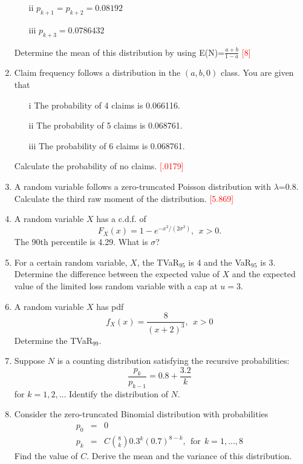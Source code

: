 \documentclass{article}
\begin{document}
\begin{enumerate}
\begin{enumerate}
	\item[ii] $p_{k+1}=p_{k+2}=0.08192$
	\item[iii] $p_{k+3}=0.0786432$
	\end{enumerate}
Determine the mean of this distribution by using E(N)=$\frac{a+b}{1-a}$ \textcolor{red}{[8]}
\item 
Claim frequency follows a distribution in the $(a,b,0)$ class. You are given that
	\begin{enumerate}
	\item[i]The probability of 4 claims is 0.066116.
	\item[ii] The probability of 5 claims is 0.068761.
	\item[iii] The probability of 6 claims is 0.068761.
	\end{enumerate}
Calculate the probability of no claims. \textcolor{red}{[.0179]}
\item
A random variable follows a zero-truncated Poisson distribution with $\lambda$=0.8. Calculate the third raw moment of the distribution. \textcolor{red}{[5.869]}

\item A random variable $X$ has a c.d.f. of \[F_X(x) = 1-e^{-x^2/(2\sigma^2)}, ~~ x > 0. \] The 90th percentile is 4.29. What is $\sigma$?

\item For a certain random variable, $X$, the TVaR$_{95}$ is 4 and the VaR$_{95}$ is 3. Determine the difference between the expected value of $X$ and the expected value of the limited loss random variable with a cap at $u=3$. 


\item A random variable $X$ has pdf \[ f_X(x) = \frac{8}{(x+2)^3},~~x>0\] Determine the TVaR$_{99}$. 

\item Suppose $N$ is a counting distribution satisfying the recursive probabilities:
\[\frac{p_{k}}{p_{k-1}} = 0.8 + \frac{3.2}{k}\]
for $k=1,2,\ldots$
Identify the distribution of $N$.

\item Consider the zero-truncated Binomial distribution with probabilities
\begin{eqnarray*}
p_0 &=& 0 \\
p_k &=& C \binom{8}{k} 0.3^k (0.7)^{8-k} , \ \ \text{for} \ \ k=1,...,8
\end{eqnarray*}
Find the value of $C$. Derive the mean and the variance of this distribution.

\end{enumerate} 
\end{document}
